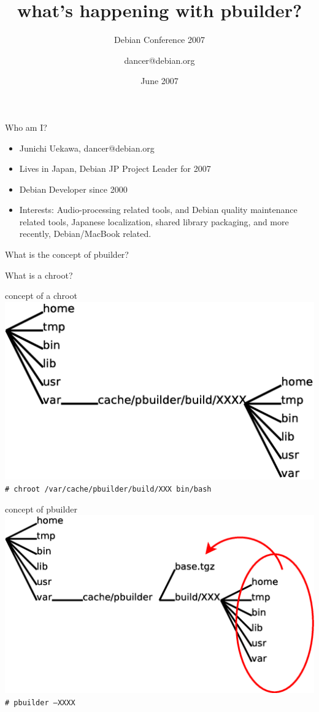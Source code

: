 \documentclass[dvipdfm,12pt,times]{beamer}
\title{what's happening with pbuilder?}
\subtitle{Debian Conference 2007}
\author{dancer@debian.org}
\date{June 2007}
\newcommand{\emtext}[1]{
\begin{frame}{}
 
{\Huge #1
}
\end{frame}
}
\begin{document}
\frame{\titlepage{}}


\begin{frame}{Who am I?}
\begin{itemize}
 \item Junichi Uekawa, dancer@debian.org
 \item Lives in Japan, Debian JP Project Leader for 2007
 \item Debian Developer since 2000
 \item Interests: Audio-processing related tools, and 
       Debian quality maintenance related tools,
       Japanese localization, shared library packaging, 
       and more recently, Debian/MacBook related.
\end{itemize}
\end{frame}

\emtext{What is the concept of pbuilder?}

\emtext{What is a chroot?}

\begin{frame}{concept of a chroot}
 \includegraphics[width=1\hsize]{chroot.eps}\\
\texttt{\# chroot /var/cache/pbuilder/build/XXX bin/bash}
\end{frame}

\begin{frame}{concept of pbuilder}
 \includegraphics[width=1\hsize]{chroot-pbuilder.eps}\\
\texttt{\# pbuilder --XXXX}
\end{frame}
\end{document}

